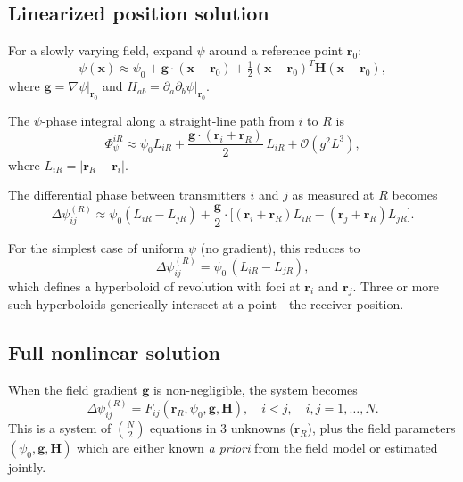 \documentclass[aps,prd,twocolumn,superscriptaddress,nofootinbib]{revtex4-2}
\begin{document}
\subsection{Linearized position solution}\label{sec:linear-pos}

For a slowly varying field, expand $\psi$ around a reference point
$\mathbf{r}_0$:
\begin{equation}\label{eq:psi-Taylor}
\psi(\mathbf{x}) \approx \psi_0 + \mathbf{g}\cdot(\mathbf{x}-\mathbf{r}_0)
+ \tfrac{1}{2}(\mathbf{x}-\mathbf{r}_0)^T \mathbf{H}
(\mathbf{x}-\mathbf{r}_0),
\end{equation}
where $\mathbf{g} = \nabla\psi|_{\mathbf{r}_0}$ and
$H_{ab} = \partial_a\partial_b\psi|_{\mathbf{r}_0}$.

The $\psi$-phase integral along a straight-line path from $i$ to $R$ is
\begin{equation}\label{eq:Phi-linear}
\Phi_{\psi}^{iR} \approx \psi_0 L_{iR} + \frac{\mathbf{g}\cdot
(\mathbf{r}_i + \mathbf{r}_R)}{2}\,L_{iR} + \mathcal{O}(g^2 L^3),
\end{equation}
where $L_{iR} = |\mathbf{r}_R - \mathbf{r}_i|$.

The differential phase between transmitters $i$ and $j$ as measured at
$R$ becomes
\begin{equation}\label{eq:DPsi-linear}
\Delta\psi_{ij}^{(R)} \approx \psi_0(L_{iR} - L_{jR})
+ \frac{\mathbf{g}}{2}\cdot\bigl[(\mathbf{r}_i+\mathbf{r}_R)L_{iR}
- (\mathbf{r}_j+\mathbf{r}_R)L_{jR}\bigr].
\end{equation}

For the simplest case of uniform $\psi$ (no gradient), this reduces to
\begin{equation}\label{eq:DPsi-uniform}
\Delta\psi_{ij}^{(R)} = \psi_0\,(L_{iR} - L_{jR}),
\end{equation}
which defines a hyperboloid of revolution with foci at $\mathbf{r}_i$
and $\mathbf{r}_j$. Three or more such hyperboloids generically
intersect at a point---the receiver position.

\subsection{Full nonlinear solution}\label{sec:nonlinear}

When the field gradient $\mathbf{g}$ is non-negligible, the system
becomes
\begin{equation}\label{eq:system}
\Delta\psi_{ij}^{(R)} = F_{ij}(\mathbf{r}_R, \psi_0, \mathbf{g}, \mathbf{H}),
\quad i < j, \quad i,j = 1,\ldots,N.
\end{equation}
This is a system of $\binom{N}{2}$ equations in 3 unknowns
($\mathbf{r}_R$), plus the field parameters $(\psi_0, \mathbf{g}, \mathbf{H})$
which are either known \emph{a priori} from the field model or estimated
jointly.
\end{document}
